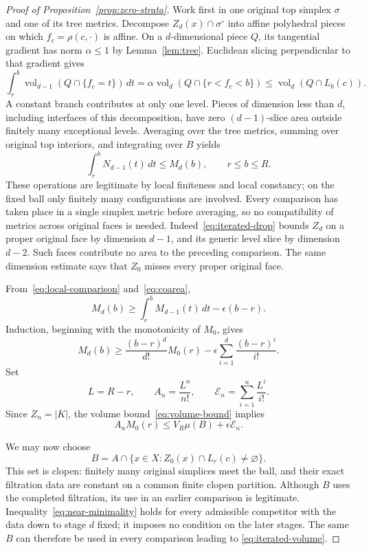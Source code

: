 \begin{proof}[Proof of Proposition~\ref{prop:zero-strata}]
Work first in one original top simplex $\sigma$ and one of its tree
metrics.  Decompose $Z_d(x)\cap\sigma^\circ$ into affine polyhedral
pieces on which $f_c=\rho(c,\cdot)$ is affine.  On a $d$-dimensional
piece $Q$, its tangential gradient has norm $\alpha\le1$ by
Lemma~\ref{lem:tree}.  Euclidean slicing perpendicular to that gradient
gives
\[
 \int_r^b\operatorname{vol}_{d-1}(Q\cap\{f_c=t\})\,dt
 =\alpha\operatorname{vol}_d(Q\cap\{r<f_c<b\})
 \le\operatorname{vol}_d(Q\cap L_b(c)).
\]
A constant branch contributes at only one level.  Pieces of dimension
less than $d$, including interfaces of this decomposition, have zero
$(d-1)$-slice area outside finitely many exceptional levels.  Averaging
over the tree metrics, summing over original top interiors, and
integrating over $B$ yields
\begin{equation}\label{eq:coarea}
 \int_r^bN_{d-1}(t)\,dt\le M_d(b),\qquad r\le b\le R.
\end{equation}
These operations are legitimate by local finiteness and local constancy;
on the fixed ball only finitely many configurations are involved.
Every comparison has taken place in a single simplex metric before
averaging, so no compatibility of metrics across original faces is needed.
Indeed~\eqref{eq:iterated-drop} bounds $Z_d$ on a proper original face
by dimension $d-1$, and its generic level slice by dimension $d-2$.
Such faces contribute no area to the preceding comparison.  The same
dimension estimate says that $Z_0$ misses every proper original face.

From~\eqref{eq:local-comparison} and~\eqref{eq:coarea},
\[
 M_d(b)\ge\int_r^bM_{d-1}(t)\,dt-\epsilon(b-r).
\]
Induction, beginning with the monotonicity of $M_0$, gives
\[
 M_d(b)\ge
 \frac{(b-r)^d}{d!}M_0(r)
 -\epsilon\sum_{i=1}^d\frac{(b-r)^i}{i!}.
\]
Set
\[
 L=R-r,\qquad A_n=\frac{L^n}{n!},\qquad
 \mathcal E_n=\sum_{i=1}^n\frac{L^i}{i!}.
\]
Since $Z_n=|K|$, the volume bound~\eqref{eq:volume-bound} implies
\begin{equation}\label{eq:iterated-volume}
 A_nM_0(r)\le V_R\mu(B)+\epsilon \mathcal E_n.
\end{equation}

We may now choose
\[
 B=A\cap\{x\in X:Z_0(x)\cap L_r(c)\ne\varnothing\}.
\]
This set is clopen: finitely many original simplices meet the ball, and
their exact filtration data are constant on a common finite clopen
partition.  Although $B$ uses the completed filtration, its use in an
earlier comparison is legitimate.  Inequality~\eqref{eq:near-minimality}
holds for every admissible competitor with the data down to stage $d$
fixed; it imposes no condition on the later stages.  The same $B$ can
therefore be used in every comparison leading to
\eqref{eq:iterated-volume}.


\end{proof}
